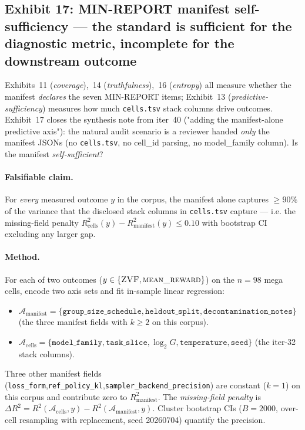 \subsection{Exhibit 17: MIN-REPORT manifest self-sufficiency — the standard is sufficient for the diagnostic metric, incomplete for the downstream outcome}
\label{sec:p5-exhibit-manifest-self-suff}

Exhibits~11 (\emph{coverage}),~14 (\emph{truthfulness}),~16
(\emph{entropy}) all measure whether the manifest \emph{declares} the
seven MIN-REPORT items; Exhibit~13 (\emph{predictive-sufficiency})
measures how much \texttt{cells.tsv} stack columns drive outcomes. Exhibit~17
closes the synthesis note from iter~40 ("adding the manifest-alone
predictive axis"): the natural audit scenario is a reviewer handed
\emph{only} the manifest JSONs (no \texttt{cells.tsv}, no cell\_id parsing,
no model\_family column). Is the manifest \emph{self-sufficient}?

\paragraph{Falsifiable claim.}
For \emph{every} measured outcome $y$ in the corpus, the manifest
alone captures $\geq 90\%$ of the variance that the disclosed stack
columns in \texttt{cells.tsv} capture --- i.e. the missing-field penalty
$R^2_\text{cells}(y) - R^2_\text{manifest}(y) \leq 0.10$ with
bootstrap CI excluding any larger gap.

\paragraph{Method.}
For each of two outcomes ($y\in\{\textsc{ZVF},\textsc{mean\_reward}\}$)
on the $n{=}98$ mega cells, encode two axis sets and fit in-sample
linear regression:
\begin{itemize}\itemsep0pt
  \item $\mathcal{A}_\text{manifest} = \{\texttt{group\_size\_schedule},
        \texttt{heldout\_split}, \texttt{decontamination\_notes}\}$
        (the three manifest fields with $k\geq 2$ on this corpus).
  \item $\mathcal{A}_\text{cells} = \{\texttt{model\_family},
        \texttt{task\_slice}, \log_2 G, \texttt{temperature},
        \texttt{seed}\}$ (the iter-32 stack columns).
\end{itemize}
Three other manifest fields
(\texttt{loss\_form},\texttt{ref\_policy\_kl},\texttt{sampler\_backend\_precision})
are constant ($k{=}1$) on this corpus and contribute zero to
$R^2_\text{manifest}$. The \emph{missing-field penalty} is
$\Delta R^2 = R^2(\mathcal{A}_\text{cells}, y) -
R^2(\mathcal{A}_\text{manifest}, y)$. Cluster bootstrap CIs
($B{=}2000$, over-cell resampling with replacement, seed 20260704)
quantify the precision.

